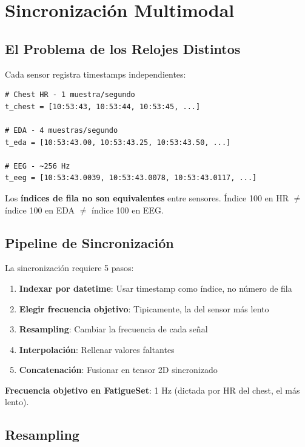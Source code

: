 \documentclass[11pt,twoside,a4paper]{article}
\begin{document}
\newpage
\section{Sincronización Multimodal}

\subsection{El Problema de los Relojes Distintos}

Cada sensor registra timestamps independientes:

\begin{lstlisting}
# Chest HR - 1 muestra/segundo
t_chest = [10:53:43, 10:53:44, 10:53:45, ...]

# EDA - 4 muestras/segundo
t_eda = [10:53:43.00, 10:53:43.25, 10:53:43.50, ...]

# EEG - ~256 Hz
t_eeg = [10:53:43.0039, 10:53:43.0078, 10:53:43.0117, ...]
\end{lstlisting}

Los \textbf{índices de fila no son equivalentes} entre sensores. Índice 100 en HR $\neq$ índice 100 en EDA $\neq$ índice 100 en EEG.

\subsection{Pipeline de Sincronización}

La sincronización requiere 5 pasos:

\begin{enumerate}
    \item \textbf{Indexar por datetime}: Usar timestamp como índice, no número de fila
    \item \textbf{Elegir frecuencia objetivo}: Tipicamente, la del sensor más lento
    \item \textbf{Resampling}: Cambiar la frecuencia de cada señal
    \item \textbf{Interpolación}: Rellenar valores faltantes
    \item \textbf{Concatenación}: Fusionar en tensor 2D sincronizado
\end{enumerate}

\textbf{Frecuencia objetivo en FatigueSet}: 1 Hz (dictada por HR del chest, el más lento).

\subsection{Resampling}
\end{document}
